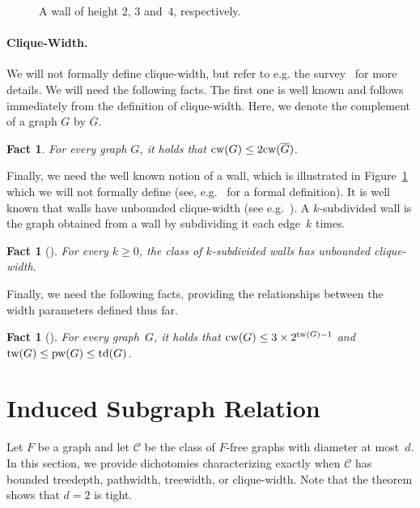\documentclass[runningheads,envcountsame]{llncs}
\newtheorem{fact}[theorem]{Fact}
\newcommand{\forbiddenGraph}{F}
\newcommand{\td}{{\textup{td}}}
\newcommand{\tw}{{\textup{tw}}}
\newcommand{\cw}{{\textup{cw}}}
\newcommand{\pw}{{\textup{pw}}}
\begin{document}
\begin{figure}
\begin{center}
\begin{minipage}{0.35\textwidth}
\end{minipage}
\caption{A wall of height $2$, $3$ and~$4$, respectively.}\label{fig:walls}
\end{center}
\end{figure}

\paragraph{Clique-Width.}  
We will not formally define clique-width, but refer to
e.g. the survey~\cite{DJP19} for more details. We will
need the following facts.
The first one
is well known and follows immediately from the definition of clique-width. Here, we denote the complement of a graph $G$ by 
$\overline{G}$.

\begin{fact}\label{fact:CW-COMP}
 For every graph $G$, it holds that
  $\cw(G)\leq 2\cw(\overline{G})$.
\end{fact}
Finally, we need the well known notion of a wall, which is illustrated
in Figure~\ref{fig:walls} which we will not
formally define (see, e.g.~\cite{Ch15} for a
formal definition). It is well known that walls have unbounded
clique-width (see e.g.~\cite{DBLP:journals/dam/KaminskiLM09}).
A $k$-subdivided wall is the graph obtained from a wall by subdividing it each edge~$k$ times.
\begin{fact}[{\cite{LR06}}]\label{fact:walls}
For every $k \geq 0$, the class of $k$-subdivided walls has unbounded clique-width.
\end{fact}
Finally, we need the following facts, providing the relationships
between the width parameters defined thus far.
\begin{fact}[{\cite{CR05}}]\label{fact:decrel}
  For every graph~$G$, it holds that $\cw(G) \leq 3 \times 2^{\tw(G)-1}$ and $\tw(G) \leq \pw(G)\leq \td(G)$.
\end{fact}


\section{Induced Subgraph Relation}\label{sec:indsubgraph}
Let $\forbiddenGraph$ be a graph and let $\mathcal{C}$ be the class of
$\forbiddenGraph$-free graphs with diameter at most~$d$. In this
section, we provide dichotomies characterizing exactly when $\mathcal{C}$ has
bounded treedepth, pathwidth, treewidth, or clique-width.
Note that the theorem shows that $d=2$ is tight.
\end{document}
